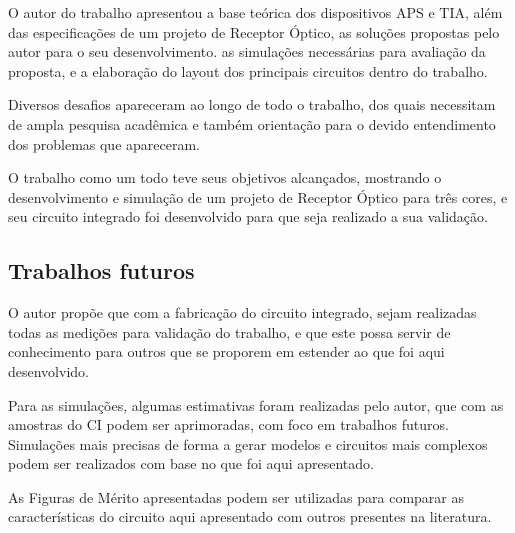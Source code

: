 
O autor do trabalho apresentou a base teórica dos dispositivos APS e TIA, além das especificações de um projeto de Receptor Óptico, as soluções propostas pelo autor para o seu desenvolvimento. as simulações necessárias para avaliação da proposta, e a elaboração do layout dos principais circuitos dentro do trabalho.

Diversos desafios apareceram ao longo de todo o trabalho, dos quais necessitam de ampla pesquisa acadêmica e também orientação para o devido entendimento dos problemas que apareceram.

O trabalho como um todo teve seus objetivos alcançados, mostrando o desenvolvimento e simulação de um projeto de Receptor Óptico para três cores, e seu circuito integrado foi desenvolvido para que seja realizado a sua validação.

\subsection{Trabalhos futuros}

O autor propõe que com a fabricação do circuito integrado, sejam realizadas todas as medições para validação do trabalho, e que este possa servir de conhecimento para outros que se proporem em estender ao que foi aqui desenvolvido.

Para as simulações, algumas estimativas foram realizadas pelo autor, que com as amostras do CI podem ser aprimoradas, com foco em trabalhos futuros. Simulações mais precisas de forma a gerar modelos e circuitos mais complexos podem ser realizados com base no que foi aqui apresentado.

As Figuras de Mérito apresentadas podem ser utilizadas para comparar as características do circuito aqui apresentado com outros presentes na literatura.